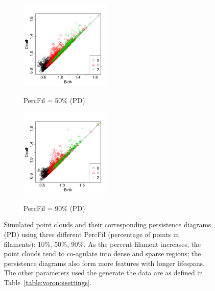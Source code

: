 \documentclass[12pt]{article}
\begin{document}
\begin{center}
\begin{figure}[htp!]
\begin{subfigure}{.32\textwidth}
      \label{fig:percfil01pd}
    \end{subfigure}
      \begin{subfigure}{.32\textwidth}
      \centering
      \caption{PercFil = 50\% (PD)}
      \includegraphics[height=1.75in]{figure_7_pd_0_5.pdf}
      \label{fig:percfil09pd}
    \end{subfigure}
      \begin{subfigure}{.32\textwidth}
      \centering
      \caption{PercFil = 90\% (PD)}
      \includegraphics[height=1.75in]{figure_7_pd_0_9.pdf}
      \label{fig:percfil09pd}
    \end{subfigure}
      \caption{Simulated point clouds and their corresponding persistence diagrams (PD) using three different PercFil (percentage of points in filaments):  10\%, 50\%, 90\%. As the percent filament increases, the point clouds tend to co-agulate into dense and sparse regions; the persistence diagrams also form more features with longer lifespans. The other parameters used the generate the data are as defined in Table~\ref{table:voronoisettings}.}
      \label{fig:percfilexample}
  \end{figure}
\end{center}
\end{document}
